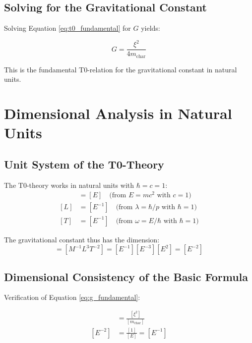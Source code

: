 \documentclass[12pt,a4paper]{article}
\begin{document}
	\subsection{Solving for the Gravitational Constant}
	
	Solving Equation \eqref{eq:t0_fundamental} for $G$ yields:
	
	\begin{equation}
		G = \frac{\xi^2}{4 m_{\text{char}}}
		\label{eq:g_fundamental}
	\end{equation}
	
	This is the fundamental T0-relation for the gravitational constant in natural units.
	
	\section{Dimensional Analysis in Natural Units}
	
	\subsection{Unit System of the T0-Theory}
	
	\begin{analysis}
		The T0-theory works in natural units with $\hbar = c = 1$:
		\begin{align}
			[M] &= [E] \quad \text{(from } E = mc^2 \text{ with } c = 1\text{)} \\
			[L] &= [E^{-1}] \quad \text{(from } \lambda = \hbar/p \text{ with } \hbar = 1\text{)} \\
			[T] &= [E^{-1}] \quad \text{(from } \omega = E/\hbar \text{ with } \hbar = 1\text{)}
		\end{align}
		
		The gravitational constant thus has the dimension:
		\begin{equation}
			[G] = [M^{-1}L^3T^{-2}] = [E^{-1}][E^{-3}][E^2] = [E^{-2}]
		\end{equation}
	\end{analysis}
	
	\subsection{Dimensional Consistency of the Basic Formula}
	
	Verification of Equation \eqref{eq:g_fundamental}:
	
	\begin{align}
		[G] &= \frac{[\xi^2]}{[m_{\text{char}}]} \\
		[E^{-2}] &= \frac{[1]}{[E]} = [E^{-1}]
	\end{align}
	
\end{document}
